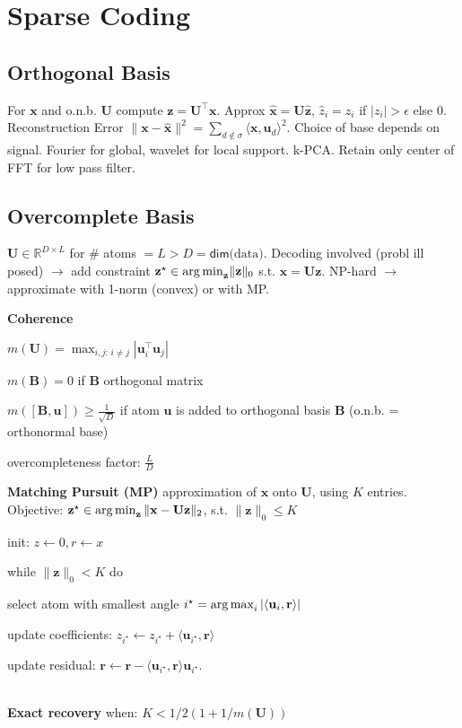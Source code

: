 \section{Sparse Coding}

\subsection*{Orthogonal Basis}
For $\mathbf{x}$ and o.n.b. $\mathbf{U}$ compute $\mathbf{z} = \mathbf{U}^\top \mathbf{x} $. Approx $ \mathbf{\hat{x}} = \mathbf{U\hat{z}}$, $\hat{z}_i = z_i$ if $ \lvert z_i \rvert > \epsilon$ else 0.
Reconstruction Error $\|\mathbf{x}-\mathbf{\hat{x}}\|^2 = \sum_{d\notin\sigma}\langle\mathbf{x},\mathbf{u}_d\rangle ^2$. 
Choice of base depends on signal. Fourier for global, wavelet for local support. k-PCA. Retain only center of FFT for low pass filter.

\subsection*{Overcomplete Basis}
$\mathbf{U} \in \mathbb{R}^{D \times  L}$ for \# atoms $ = L > D = \mathsf{dim}\text{(data)}$. Decoding involved (probl ill posed) $\rightarrow$ add constraint $\mathbf{z}^\star \in \operatorname*{arg\,min}_\mathbf{z} \lVert \mathbf{z} \rVert_0$ s.t. $\mathbf{x} = \mathbf{Uz}$. NP-hard $\rightarrow$ approximate with 1-norm (convex) or with MP.

\textbf{Coherence}
\begin{inparaitem}[\color{red}\textbullet]
	\item $m(\mathbf{U}) = \max_{i,j:\, i \neq j} | \mathbf{u}_i^\top \mathbf{u}_j |$
	\item $m(\mathbf{B}) = 0$ if $\mathbf{B}$ orthogonal matrix
	\item $m([\mathbf{B}, \mathbf{u}]) \geq \frac{1}{\sqrt{D}}$ if atom $\mathbf{u}$ is added to orthogonal basis $\mathbf{B}$ (o.n.b. = orthonormal base) \item overcompleteness factor: $\frac{L}{D}$
\end{inparaitem}

\textbf{Matching Pursuit (MP)}
approximation of $\mathbf{x}$ onto $\mathbf{U}$, using $K$ entries.
Objective: $\mathbf{z}^\star \in \operatorname*{arg\,min}_{\mathbf{z}} \|\mathbf{x} - \mathbf{Uz} \|_2$, s.t. $\|\mathbf{z}\|_0 \leq K$
\begin{inparaenum}
	\item init: $z \leftarrow 0, r \leftarrow x$
	\item while $\|\mathbf{z}\|_0 < K$ do
	\item select atom with smallest angle $i^\star = \operatorname*{arg\,max}_i |\langle \mathbf{u}_i, \mathbf{r} \rangle|$
	\item update coefficients: $z_{i^\star} \leftarrow z_{i^\star} + \langle \mathbf{u}_{i^\star}, \mathbf{r} \rangle$
	\item update residual: $\mathbf{r} \leftarrow \mathbf{r} - \langle \mathbf{u}_{i^\star}, \mathbf{r} \rangle \mathbf{u}_{i^\star}$.
\end{inparaenum}
\\\textbf{Exact recovery} when: $K<1/2( 1+1/m(\mathbf{U}))$

